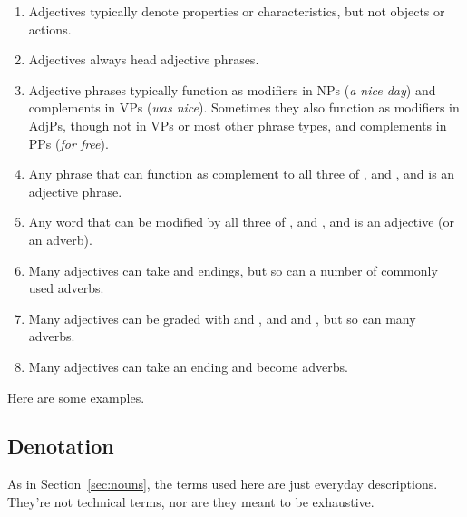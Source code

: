 \begin{enumerate}[noitemsep]
    \item {}Adjectives typically denote properties or characteristics, but not objects or actions.
    \item {}Adjectives always head adjective phrases.
    \item {}Adjective phrases typically function as modifiers in NPs (\textit{a \emph{nice} day}) and complements in VPs (\textit{was \emph{nice}}). Sometimes they also function as modifiers in AdjPs, though not in VPs or most other phrase types, and complements in PPs (\textit{for \emph{free}}).
    \item {}Any phrase that can function as complement to all three of , and , and  is an adjective phrase.
    \item {}Any word that can be modified by all three of , and , and  is an adjective (or an adverb).
    \item {}Many adjectives can take  and  endings, but so can a number of commonly used adverbs.
    \item Many adjectives can be graded with  and , and  and , but so can many adverbs.
    \item {}Many adjectives can take an  ending and become adverbs.
\end{enumerate}


Here are some examples.

\subsection{Denotation}

As in Section~\ref{sec:nouns}, the terms used here are just everyday descriptions. They're not technical terms, nor are they meant to be exhaustive.

